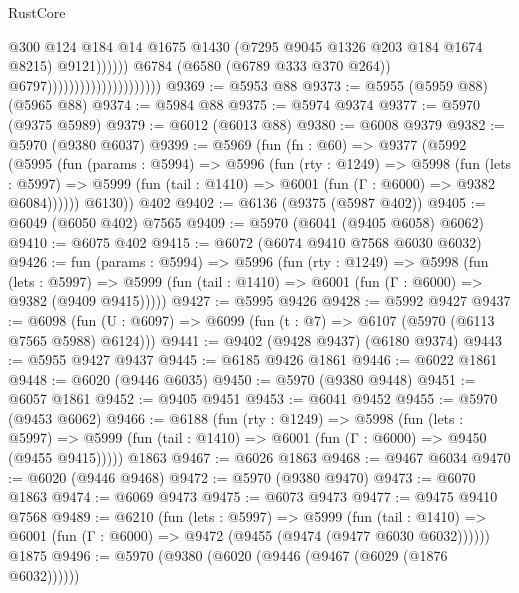 \begin{lexlean}{RustCore}
\begin{coremodule}
{\begin{coremodule}
{{{{{{{{{{{{{{{{{{{{{{{{{{{{{{{{{{{{{{{{{{{{{                                                          @300
                                                          @124
                                                          @184
                                                          @14
                                                          @1675
                                                          @1430
                                                          (@7295 @9045 @1326 @203 @184 @1674 @8215)
                                                          @9121))))))
                                              @6784
                                              (@6580 (@6789 @333 @370 @264))
                                              @6797)))))))))))))))))))))
@9369 := @5953 @88
@9373 := @5955 (@5959 @88) (@5965 @88)
@9374 := @5984 @88
@9375 := @5974 @9374
@9377 := @5970 (@9375 @5989)
@9379 := @6012 (@6013 @88)
@9380 := @6008 @9379
@9382 := @5970 (@9380 @6037)
@9399 := @5969
    (fun (fn : @60) =>
    @9377
      (@5992
        (@5995
          (fun (params : @5994) =>
          @5996
            (fun (rty : @1249) =>
            @5998
              (fun (lets : @5997) =>
              @5999 (fun (tail : @1410) => @6001 (fun (Γ : @6000) => @9382 @6084))))))
        @6130))
    @402
@9402 := @6136 (@9375 (@5987 @402))
@9405 := @6049 (@6050 @402) @7565
@9409 := @5970 (@6041 (@9405 @6058) @6062)
@9410 := @6075 @402
@9415 := @6072 (@6074 @9410 @7568 @6030 @6032)
@9426 := fun (params : @5994) =>
  @5996
    (fun (rty : @1249) =>
    @5998
      (fun (lets : @5997) =>
      @5999 (fun (tail : @1410) => @6001 (fun (Γ : @6000) => @9382 (@9409 @9415)))))
@9427 := @5995 @9426
@9428 := @5992 @9427
@9437 := @6098 (fun (U : @6097) => @6099 (fun (t : @7) => @6107 (@5970 (@6113 @7565 @5988) @6124)))
@9441 := @9402 (@9428 @9437) (@6180 @9374)
@9443 := @5955 @9427 @9437
@9445 := @6185 @9426 @1861
@9446 := @6022 @1861
@9448 := @6020 (@9446 @6035)
@9450 := @5970 (@9380 @9448)
@9451 := @6057 @1861
@9452 := @9405 @9451
@9453 := @6041 @9452
@9455 := @5970 (@9453 @6062)
@9466 := @6188
    (fun (rty : @1249) =>
    @5998
      (fun (lets : @5997) =>
      @5999 (fun (tail : @1410) => @6001 (fun (Γ : @6000) => @9450 (@9455 @9415)))))
    @1863
@9467 := @6026 @1863
@9468 := @9467 @6034
@9470 := @6020 (@9446 @9468)
@9472 := @5970 (@9380 @9470)
@9473 := @6070 @1863
@9474 := @6069 @9473
@9475 := @6073 @9473
@9477 := @9475 @9410 @7568
@9489 := @6210
    (fun (lets : @5997) =>
    @5999
      (fun (tail : @1410) => @6001 (fun (Γ : @6000) => @9472 (@9455 (@9474 (@9477 @6030 @6032))))))
    @1875
@9496 := @5970 (@9380 (@6020 (@9446 (@9467 (@6029 (@1876 @6032))))))
}}}}}}}}}}}}}}}}}}}}}}}}}}}}}}}}}}}}}}}}}}}}}
\end{coremodule}}
\end{coremodule}
\end{lexlean}
